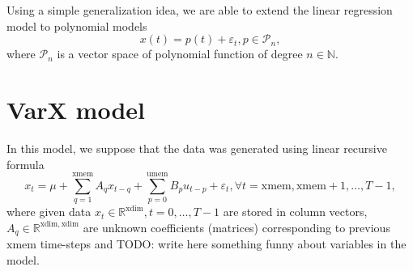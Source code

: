 \documentclass{article}
\newcommand{\todo}[1]{{\color{red}TODO: #1}} %
\begin{document}

 Using a simple generalization idea, we are able to extend the linear regression model to polynomial models
 \begin{displaymath}
  x(t) = p(t) + \varepsilon_t, p \in \mathcal{P}_n,
 \end{displaymath}
 where $\mathcal{P}_n$ is a vector space of polynomial function of degree $n \in \mathbb{N}$.
 
 \section {VarX model}

 In this model, we suppose that the data was generated using linear recursive formula
 \begin{equation}
  \label{eq:varx_stationary}
	x_t = \mu + \sum\limits_{q=1}^{\mathrm{xmem}} A_q x_{t-q} + \sum\limits_{p=0}^{\mathrm{umem}} B_p u_{t-p} + \varepsilon_t, \forall t = \mathrm{xmem}, \mathrm{xmem}+1, \dots, T-1,
 \end{equation}
 where given data $x_t \in \mathbb{R}^{\mathrm{xdim}}, t = 0,\dots,T-1$ are stored in column vectors, $A_q \in \mathbb{R}^{\mathrm{xdim},\mathrm{xdim}}$ are unknown coefficients (matrices) corresponding to previous $\mathrm{xmem}$ time-steps and \todo{write here something funny about variables in the model}.
  
\end{document}

